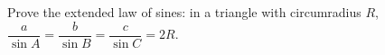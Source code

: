 Prove the extended law of sines: in a triangle with circumradius $R$, $\dfrac a{\sin A}=\dfrac b{\sin B}=\dfrac c{\sin C}=2R$.
